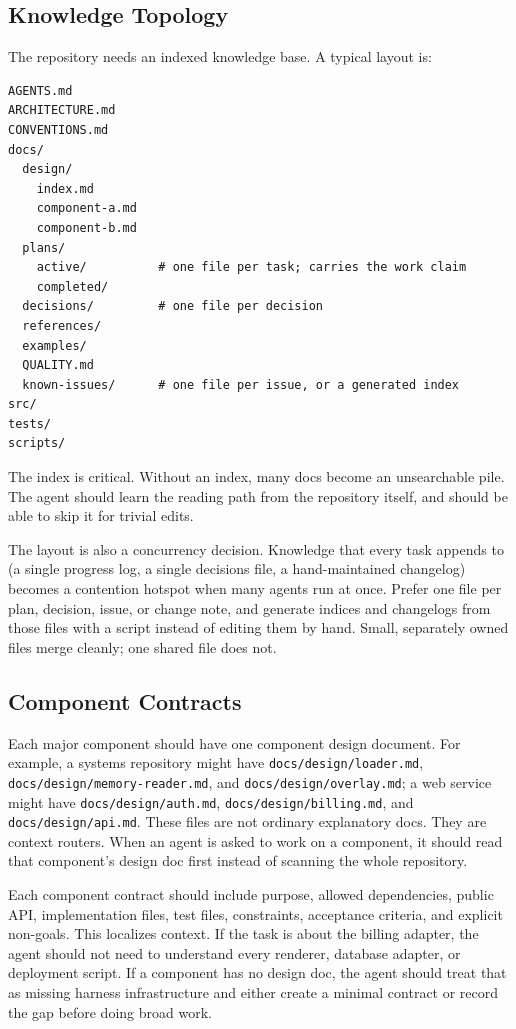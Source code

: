 \documentclass[11pt]{article}
\begin{document}
\subsection{Knowledge Topology}
The repository needs an indexed knowledge base. A typical layout is:

\begin{verbatim}
AGENTS.md
ARCHITECTURE.md
CONVENTIONS.md
docs/
  design/
    index.md
    component-a.md
    component-b.md
  plans/
    active/          # one file per task; carries the work claim
    completed/
  decisions/         # one file per decision
  references/
  examples/
  QUALITY.md
  known-issues/      # one file per issue, or a generated index
src/
tests/
scripts/
\end{verbatim}

The index is critical. Without an index, many docs become an unsearchable pile. The agent should learn the reading path from the repository itself, and should be able to skip it for trivial edits.

The layout is also a concurrency decision. Knowledge that every task appends to (a single progress log, a single decisions file, a hand-maintained changelog) becomes a contention hotspot when many agents run at once. Prefer one file per plan, decision, issue, or change note, and generate indices and changelogs from those files with a script instead of editing them by hand. Small, separately owned files merge cleanly; one shared file does not.

\subsection{Component Contracts}
Each major component should have one component design document. For example, a systems repository might have \texttt{docs/design/loader.md}, \texttt{docs/design/memory-reader.md}, and \texttt{docs/design/overlay.md}; a web service might have \texttt{docs/design/auth.md}, \texttt{docs/design/billing.md}, and \texttt{docs/design/api.md}. These files are not ordinary explanatory docs. They are context routers. When an agent is asked to work on a component, it should read that component's design doc first instead of scanning the whole repository.

Each component contract should include purpose, allowed dependencies, public API, implementation files, test files, constraints, acceptance criteria, and explicit non-goals. This localizes context. If the task is about the billing adapter, the agent should not need to understand every renderer, database adapter, or deployment script. If a component has no design doc, the agent should treat that as missing harness infrastructure and either create a minimal contract or record the gap before doing broad work.
\end{document}
